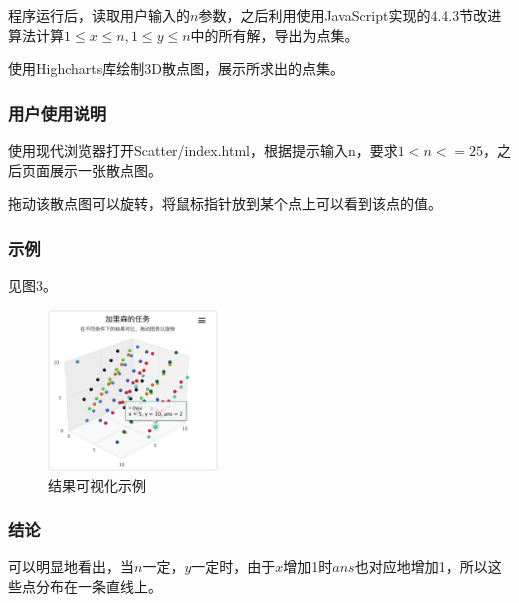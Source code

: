 \documentclass{article}
\begin{document}
程序运行后，读取用户输入的$n$参数，之后利用使用JavaScript实现的4.4.3节改进算法计算$1 \leq x\leq n,1\leq y\leq n$中的所有解，导出为点集。

使用Highcharts库绘制3D散点图，展示所求出的点集。

\subsubsection{用户使用说明}

使用现代浏览器打开Scatter/index.html，根据提示输入n，要求$1 < n <= 25$，之后页面展示一张散点图。

拖动该散点图可以旋转，将鼠标指针放到某个点上可以看到该点的值。

\subsubsection{示例}

见图3。

\begin{figure}[htbp]
    
    \centering\includegraphics[width=0.4\textwidth]{./Images/Scatter.png}
    
    \caption{结果可视化示例}
    
\end{figure}

\subsubsection{结论}

可以明显地看出，当$n$一定，$y$一定时，由于$x$增加1时$ans$也对应地增加1，所以这些点分布在一条直线上。
\end{document}
